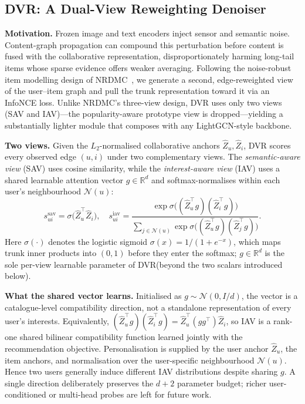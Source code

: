 \documentclass[conference]{IEEEtran}
\newcommand{\dvr}{DVR\xspace}
\begin{document}
\subsection{\dvr: A Dual-View Reweighting Denoiser}
\label{sec:dvr}

\noindent\textbf{Motivation.} Frozen image and text encoders inject
sensor and semantic noise. Content-graph propagation can compound
this perturbation before content is fused with the collaborative
representation, disproportionately harming long-tail items whose sparse
evidence offers weaker averaging. Following the noise-robust item modelling design of
NRDMC~\cite{gong2026noise}, we generate a second, edge-reweighted
view of the user--item graph and pull the trunk representation
toward it via an InfoNCE loss. Unlike NRDMC's three-view design, \dvr
uses only two views (SAV and IAV)---the popularity-aware
prototype view is dropped---yielding a substantially lighter module
that composes with any LightGCN-style backbone.

\noindent\textbf{Two views.} Given the $L_2$-normalised collaborative
anchors $\hat Z_u, \hat Z_i$, \dvr scores every observed edge $(u,i)$
under two complementary views. The \emph{semantic-aware view} (SAV)
uses cosine similarity, while the \emph{interest-aware view} (IAV)
uses a shared learnable attention vector $g\in\mathbb{R}^{d}$ and
softmax-normalises within each user's neighbourhood $\mathcal{N}(u)$:
\begin{equation}
s^{\text{sav}}_{ui} = \sigma\!\big(\hat Z_u^{\top}\hat Z_i\big),\quad
s^{\text{iav}}_{ui} =
\frac{\exp\!\sigma\!\big((\hat Z_u^{\top}g)(\hat Z_i^{\top}g)\big)}
     {\sum_{j\in\mathcal{N}(u)}
       \exp\!\sigma\!\big((\hat Z_u^{\top}g)(\hat Z_j^{\top}g)\big)}.
\label{eq:saviav}
\end{equation}
Here $\sigma(\cdot)$ denotes the logistic sigmoid
$\sigma(x)=1/(1+e^{-x})$, which maps trunk inner products into
$(0,1)$ before they enter the softmax; $g\in\mathbb{R}^{d}$ is the
sole per-view learnable parameter of \dvr (beyond the two scalars
introduced below).

\noindent\textbf{What the shared vector learns.}
Initialised as $g\sim\mathcal N(0,I/d)$, the vector is a
catalogue-level compatibility direction, not a
standalone representation of every user's interests. Equivalently,
$(\hat Z_u^\top g)(\hat Z_i^\top g)=
\hat Z_u^\top(gg^\top)\hat Z_i$, so IAV is a rank-one shared bilinear
compatibility function learned jointly with the recommendation
objective. Personalisation is supplied by the user anchor $\hat Z_u$,
the item anchors, and normalisation over the user-specific
neighbourhood $\mathcal N(u)$. Hence two users generally induce
different IAV distributions despite sharing $g$. A single direction
deliberately preserves the $d{+}2$ parameter budget; richer
user-conditioned or multi-head probes are left for future work.
\end{document}
